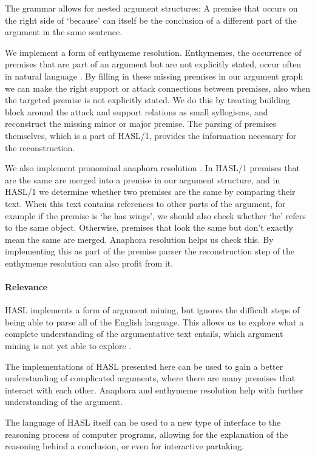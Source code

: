 \documentclass{IOS-Book-Article}
\begin{document}
The grammar allows for nested argument structures: A premise that occurs on the right side of `because' can itself be the conclusion of a different part of the argument in the same sentence.

We implement a form of enthymeme resolution. Enthymemes, the occurrence of premises that are part of an argument but are not explicitly stated, occur often in natural language \cite{walton2005,reedRowe2004}. By filling in these missing premises in our argument graph we can make the right support or attack connections between premises, also when the targeted premise is not explicitly stated. We do this by treating building block around the attack and support relations as small syllogisms, and reconstruct the missing minor or major premise. The parsing of premises themselves, which is a part of HASL/1, provides the information necessary for the reconstruction.

We also implement pronominal anaphora resolution \cite{hobbs1978}. In HASL/1 premises that are the same are merged into a premise in our argument structure, and in HASL/1 we determine whether two premises are the same by comparing their text. When this text contains references to other parts of the argument, for example if the premise is `he has wings', we should also check whether `he' refers to the same object. Otherwise, premises that look the same but don't exactly mean the same are merged. Anaphora resolution helps us check this. By implementing this as part of the premise parser the reconstruction step of the enthymeme resolution can also profit from it.

\paragraph{Relevance}
HASL implements a form of argument mining, but ignores the difficult steps of being able to parse all of the English language. This allows us to explore what a complete understanding of the argumentative text entails, which argument mining is not yet able to explore \cite{stabGurevych2017}.

The implementations of HASL presented here can be used to gain a better understanding of complicated arguments, where there are many premises that interact with each other. Anaphora and enthymeme resolution help with further understanding of the argument.

The language of HASL itself can be used to a new type of interface to the reasoning process of computer programs, allowing for the explanation of the reasoning behind a conclusion, or even for interactive partaking.
\end{document}
